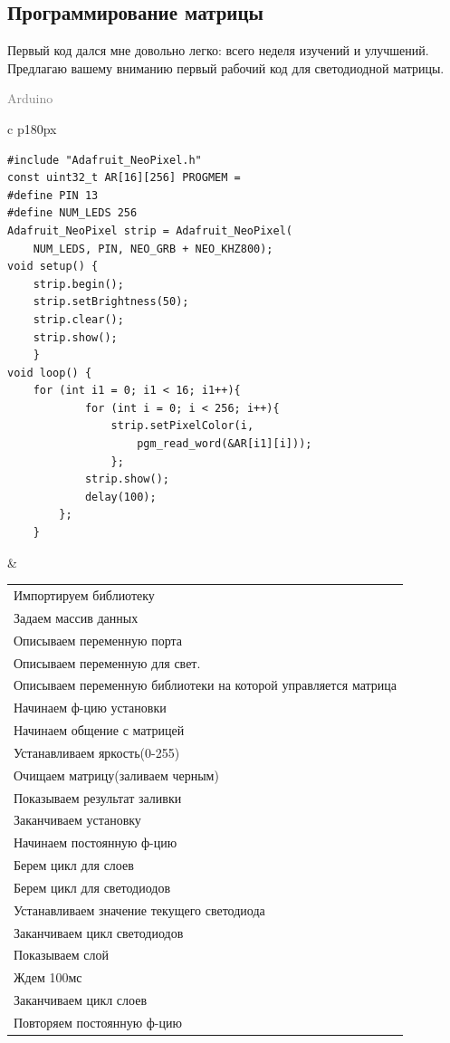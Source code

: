 \documentclass[a4paper, 12pt]{article}
\begin{document}
\subsection{Программирование матрицы}
Первый код дался мне довольно легко: всего неделя изучений и улучшений. Предлагаю
вашему вниманию первый рабочий код для светодиодной матрицы.
\begin{flushright}\begin{huge}\textcolor{grey}{Arduino}\end{huge}\end{flushright}
\begin{tabular}{c p{180px}}
\hline
\begin{lstlisting}[style=myLatexStyle]
#include "Adafruit_NeoPixel.h"
const uint32_t AR[16][256] PROGMEM = 
#define PIN 13        
#define NUM_LEDS 256   
Adafruit_NeoPixel strip = Adafruit_NeoPixel(
    NUM_LEDS, PIN, NEO_GRB + NEO_KHZ800);
void setup() {
    strip.begin();
    strip.setBrightness(50);    
    strip.clear();                          
    strip.show();                           
	}
void loop() {
    for (int i1 = 0; i1 < 16; i1++){
			for (int i = 0; i < 256; i++){
				strip.setPixelColor(i,
					pgm_read_word(&AR[i1][i]));
				};
			strip.show();
			delay(100);
		};
	}
\end{lstlisting}
&
\begin{tabular}{p{180px}}
Импортируем библиотеку\\
Задаем массив данных\\
Описываем переменную порта\\
Описываем переменную для свет.\\
Описываем переменную библиотеки
на которой управляется матрица\\
Начинаем ф-цию установки\\
Начинаем общение с матрицей\\
Устанавливаем яркость(0-255)\\
Очищаем матрицу(заливаем черным)\\
Показываем результат заливки\\
Заканчиваем установку\\
Начинаем постоянную ф-цию\\
Берем цикл для слоев\\
Берем цикл для светодиодов\\
Устанавливаем значение 
текущего светодиода\\
Заканчиваем цикл светодиодов\\
Показываем слой\\
Ждем 100мс\\
Заканчиваем цикл слоев\\
Повторяем постоянную ф-цию \\
\end{tabular}\\
\end{tabular}
\end{document}
